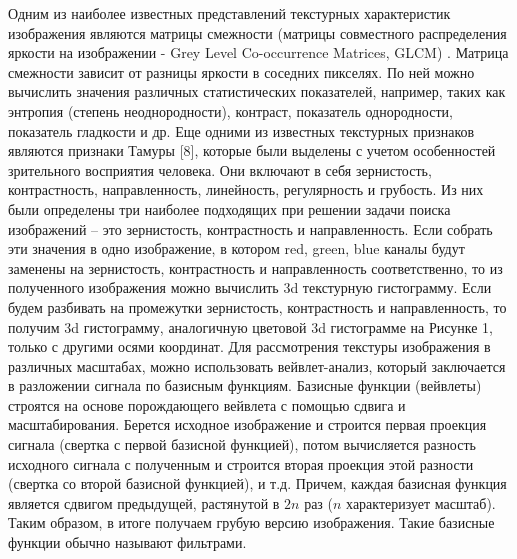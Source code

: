 Одним из наиболее известных представлений текстурных характеристик
изображения являются матрицы смежности (матрицы совместного распределения яркости
на изображении - Grey Level Co-occurrence Matrices, GLCM) \cite{haralick1973textural}. Матрица смежности зависит от разницы яркости в соседних пикселях. По ней можно вычислить значения 
различных статистических показателей, например, таких как энтропия (степень
неоднородности), контраст, показатель однородности, показатель гладкости и др.
Еще одними из известных текстурных признаков являются признаки Тамуры [8],
которые были выделены с учетом особенностей зрительного восприятия человека. Они
включают в себя зернистость, контрастность, направленность, линейность, регулярность и
грубость. Из них были определены три наиболее подходящих при решении задачи поиска
изображений – это зернистость, контрастность и направленность. Если собрать эти
значения в одно изображение, в котором red, green, blue каналы будут заменены на
зернистость, контрастность и направленность соответственно, то из полученного
изображения можно вычислить 3d текстурную гистограмму. Если будем разбивать на
промежутки зернистость, контрастность и направленность, то получим 3d гистограмму,
аналогичную цветовой 3d гистограмме на Рисунке 1, только с другими осями координат.
Для рассмотрения текстуры изображения в различных масштабах, можно
использовать вейвлет-анализ, который заключается в разложении сигнала по базисным
функциям. Базисные функции (вейвлеты) строятся на основе порождающего вейвлета с
помощью сдвига и масштабирования. Берется исходное изображение и строится первая
проекция сигнала (свертка с первой базисной функцией), потом вычисляется разность
исходного сигнала с полученным и строится вторая проекция этой разности (свертка со
второй базисной функцией), и т.д. Причем, каждая базисная функция является сдвигом
предыдущей, растянутой в $2n$ раз ($n$ характеризует масштаб). Таким образом, в итоге
получаем грубую версию изображения. Такие базисные функции обычно называют
фильтрами. 

